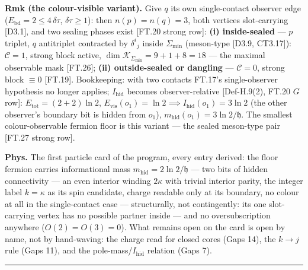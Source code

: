 \begin{theorem}
\textbf{Rmk (the colour-visible variant).} Give $q$ its own single-contact observer edge ($E_{\mathrm{bd}}=2\le4\,\delta\tau$, $\delta\tau\ge1$): then $n(p)=n(q)=3$, both vertices slot-carrying [D3.1], and two sealing phases exist [FT.20 strong row]: \textbf{(i) inside-sealed} — $p$ triplet, $q$ antitriplet contracted by $\delta^i{}_j$ inside $\Sigma_{\min}$ (meson-type [D3.9, CT3.17]): $\mathcal C=1$, strong block active, $\dim\mathcal K_{\Sigma_{\min}}=9+1+8=18$ — the maximal observable mask [FT.26]; \textbf{(ii) outside-sealed or dangling} — $\mathcal C=0$, strong block $\equiv0$ [FT.19]. Bookkeeping: with two contacts FT.17's single-observer hypothesis no longer applies; $I_{\mathrm{hid}}$ becomes observer-relative [Def-H.9(2), FT.20 $G$ row]: $E_{\mathrm{tot}}=(2{+}2)\ln2$, $E_{\mathrm{vis}}(o_1)=\ln2\implies I_{\mathrm{hid}}(o_1)=3\ln2$ (the other observer's boundary bit is hidden from $o_1$), $m_{\mathrm{hid}}(o_1)=3\ln2/\mathfrak h$. The smallest colour-observable fermion floor is this variant — the sealed meson-type pair [FT.27 strong row].

\textbf{Phys.} The first particle card of the program, every entry derived: the floor fermion carries informational mass $m_{\mathrm{hid}}=2\ln2/\mathfrak h$ — two bits of hidden connectivity — an even interior winding $2\kappa$ with trivial interior parity, the integer label $k=\kappa$ as its spin candidate, charge readable only at its boundary, no colour at all in the single-contact case — structurally, not contingently: its one slot-carrying vertex has no possible partner inside — and no oversubscription anywhere ($O(2)=O(3)=0$). What remains open on the card is open by name, not by hand-waving: the charge read for closed cores (Gaps 14), the $k\to j$ rule (Gaps 11), and the pole-mass/$I_{\mathrm{hid}}$ relation (Gaps 7).

\vspace{2pt}\noindent\rule{\textwidth}{0.4pt}\vspace{2pt}

\end{theorem}

